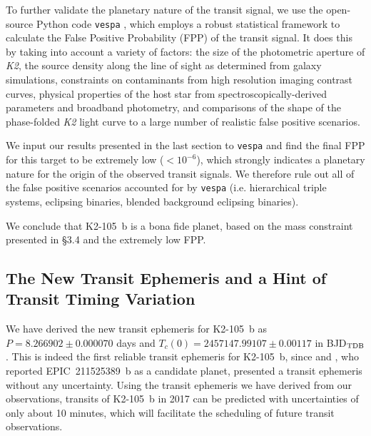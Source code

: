\documentclass[]{pasj01}
\begin{document}
To further validate the planetary nature of the transit signal,
we use the open-source Python code \texttt{vespa} 
\citep{2012ApJ...761....6M, 2015ascl.soft03011M}, which employs a 
robust statistical framework to calculate
the False Positive Probability (FPP) of the transit signal.
It does this by taking into account a variety of factors: 
the size of the photometric aperture of {\it K2}, the
source density along the line of sight as determined from galaxy simulations,
constraints on contaminants from high resolution imaging contrast curves,
physical properties of the host star from spectroscopically-derived parameters
and broadband photometry, and comparisons of the shape of the phase-folded {\it K2} light curve
to a large number of realistic false positive scenarios. 

We input our results presented in the last section to \texttt{vespa} and find 
the final FPP for this target to be extremely low ($<10^{-6}$),
which strongly indicates a planetary nature for the origin of the observed transit signals.
We therefore rule out all of the false positive scenarios accounted for by \texttt{vespa}
(i.e. hierarchical triple systems, eclipsing binaries, blended background eclipsing binaries).

We conclude that K2-105~b is a bona fide planet,
based on the mass constraint presented in \S3.4 and the extremely low FPP.

\subsection{The New Transit Ephemeris and a Hint of Transit Timing Variation}

We have derived the new transit ephemeris for K2-105~b as
$P = 8.266902 \pm 0.000070$ days and 
$T_{c} (0) = 2457147.99107\pm0.00117$ in BJD$_{\rm TDB}$.
This is indeed the first reliable transit ephemeris for K2-105~b,
since \citet{2016MNRAS.461.3399P} and \citet{2016arXiv160702339B},
who reported EPIC~211525389~b as a candidate planet, presented
a transit ephemeris without any uncertainty.
Using the transit ephemeris we have derived from our observations,
transits of K2-105~b in 2017 can be predicted with
uncertainties of only about 10 minutes, which will facilitate
the scheduling of future transit observations.
\end{document}
